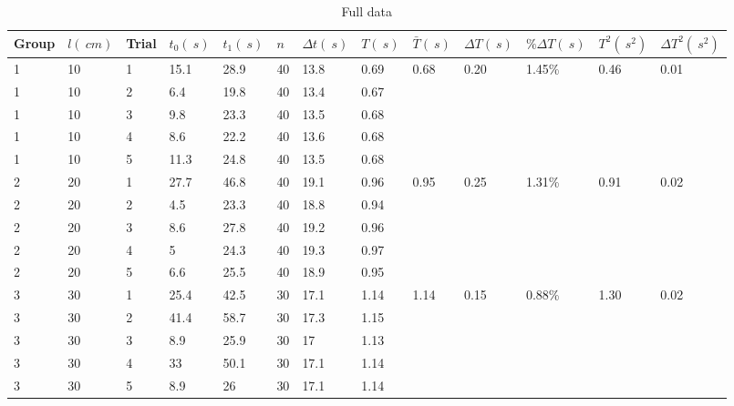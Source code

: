 \documentclass[a4paper]{article}
\newcommand{\grayrow}{\rowcolor[gray]{0.925}}
\begin{document}
\begin{table}
    \centering
    \caption{Full data}
    \label{tab.full}
    \begin{tabularx}{\textwidth}{ X X X X X X X X X X X X X }
    \hline
        Group & $l(\SI{}{cm})$ & Trial &  $t_0(\SI{}{s})$ &  $t_1(\SI{}{s})$ & $n$ & $\Delta t(\SI{}{s})$ &  $T(\SI{}{s})$ & $\bar{T}(\SI{}{s})$ & $\Delta T(\SI{}{s})$ & $\%\Delta T(\SI{}{s})$ & $T^2(\SI{}{s^2})$ & $\Delta T^2(\SI{}{s^2})$  \\ \hline
        \grayrow 1 & 10 & 1 & 15.1 & 28.9 & 40 & 13.8 & 0.69  & 0.68  & 0.20  & 1.45\% & 0.46  & 0.01   \\ %
        1 & 10 & 2 & 6.4 & 19.8 & 40 & 13.4 & 0.67  & ~ & ~ & ~ & ~ &   \\ %
        \grayrow 1 & 10 & 3 & 9.8 & 23.3 & 40 & 13.5 & 0.68  & ~ & ~ & ~ & ~ &   \\ %
        1 & 10 & 4 & 8.6 & 22.2 & 40 & 13.6 & 0.68  & ~ & ~ & ~ & ~ &   \\ %
        \grayrow 1 & 10 & 5 & 11.3 & 24.8 & 40 & 13.5 & 0.68  & ~ & ~ & ~ & ~ &   \\ %
        2 & 20 & 1 & 27.7 & 46.8 & 40 & 19.1 & 0.96  & 0.95  & 0.25  & 1.31\% & 0.91  & 0.02   \\ %
        \grayrow 2 & 20 & 2 & 4.5 & 23.3 & 40 & 18.8 & 0.94  & ~ & ~ & ~ & ~ &   \\ %
        2 & 20 & 3 & 8.6 & 27.8 & 40 & 19.2 & 0.96  & ~ & ~ & ~ & ~ &   \\ %
        \grayrow 2 & 20 & 4 & 5 & 24.3 & 40 & 19.3 & 0.97  & ~ & ~ & ~ & ~ &   \\ %
        2 & 20 & 5 & 6.6 & 25.5 & 40 & 18.9 & 0.95  & ~ & ~ & ~ & ~ &   \\ %
        \grayrow 3 & 30 & 1 & 25.4 & 42.5 & 30 & 17.1 & 1.14  & 1.14  & 0.15  & 0.88\% & 1.30  & 0.02   \\ %
        3 & 30 & 2 & 41.4 & 58.7 & 30 & 17.3 & 1.15  & ~ & ~ & ~ & ~ &   \\ %
        \grayrow 3 & 30 & 3 & 8.9 & 25.9 & 30 & 17 & 1.13  & ~ & ~ & ~ & ~ &   \\ %
        3 & 30 & 4 & 33 & 50.1 & 30 & 17.1 & 1.14  & ~ & ~ & ~ & ~ &   \\ %
        \grayrow 3 & 30 & 5 & 8.9 & 26 & 30 & 17.1 & 1.14  & ~ & ~ & ~ & ~ &   \\ %

\end{tabularx}
\end{table}
\end{document}
